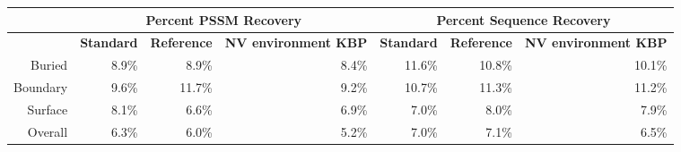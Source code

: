 
\begin{tabular}{|r||r|r|r|r|r|r|}
\hline
 & \multicolumn{3}{c}{\textbf{Percent PSSM Recovery}} & \multicolumn{3}{|c|}{\textbf{Percent Sequence Recovery}}\\
\hline
  & \textbf{Standard} & \textbf{Reference} & \textbf{NV environment KBP} & \textbf{Standard} & \textbf{Reference} & \textbf{NV environment KBP} \\
\hline
\hline
Buried & 8.9\% & 8.9\% & 8.4\% & 11.6\% & 10.8\% & 10.1\%\\
\hline
Boundary & 9.6\% & 11.7\% & 9.2\% & 10.7\% & 11.3\% & 11.2\%\\
\hline
Surface & 8.1\% & 6.6\% & 6.9\% & 7.0\% & 8.0\% & 7.9\%\\
\hline
Overall & 6.3\% & 6.0\% & 5.2\% & 7.0\% & 7.1\% & 6.5\%\\
\hline
\end{tabular}